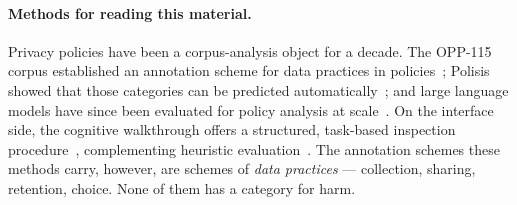 \paragraph{Methods for reading this material.}
Privacy policies have been a corpus-analysis object for a decade. The OPP-115
corpus established an annotation scheme for data practices in
policies~\parencite{wilson2016creation}; Polisis showed that those categories can
be predicted automatically~\parencite{harkous2018polisis}; and large language
models have since been evaluated for policy analysis at
scale~\parencite{rodriguez2024llm}. On the interface side, the cognitive
walkthrough offers a structured, task-based inspection
procedure~\parencite{wharton1994cognitive}, complementing heuristic
evaluation~\parencite{nielsen1994heuristic}. The annotation schemes these methods
carry, however, are schemes of \emph{data practices} --- collection, sharing,
retention, choice. None of them has a category for harm.
